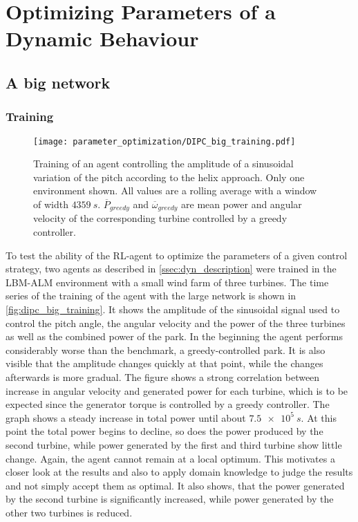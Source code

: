 \section{Optimizing Parameters of a Dynamic Behaviour}
\subsection{A big network}
\subsubsection{Training}
\begin{figure}[h]
	\centering
	\texttt{[image: parameter\_optimization/DIPC\_big\_training.pdf]}
	\caption{Training of an agent controlling the amplitude of a sinusoidal variation of the pitch according to the helix approach. Only one environment shown. All values are a rolling average with a window of width $\SI{4359}{s}$. $\overline{P}_{greedy}$ and $\overline{\omega}_{greedy}$ are mean power and angular velocity of the corresponding turbine controlled by a greedy controller.}
	\label{fig:dipc_big_training}
\end{figure}
To test the ability of the RL-agent to optimize the parameters of a given control strategy, two agents as described in \autoref{ssec:dyn_description} were trained in the LBM-ALM environment with a small wind farm of three turbines. The time series of the training of the agent with the large network is shown in \autoref{fig:dipc_big_training}. It shows the amplitude of the sinusoidal signal used to control the pitch angle, the angular velocity and the power of the three turbines as well as the combined power of the park. In the beginning the agent performs considerably worse than the benchmark, a greedy-controlled park. It is also visible that the amplitude changes quickly at that point, while the changes afterwards is more gradual. The figure shows a strong correlation between increase in angular velocity and generated power for each turbine, which is to be expected since the generator torque is controlled by a greedy controller. The graph shows a steady increase in total power until about $\SI{7.5e5}{s}$. At this point the total power begins to decline, so does the power produced by the second turbine, while power generated by the first and third turbine show little change. Again, the agent cannot remain at a local optimum. This motivates a closer look at the results and also to apply domain knowledge to judge the results and not simply accept them as optimal. It also shows, that the power generated by the second turbine is significantly increased, while power generated by the other two turbines is reduced. \\
